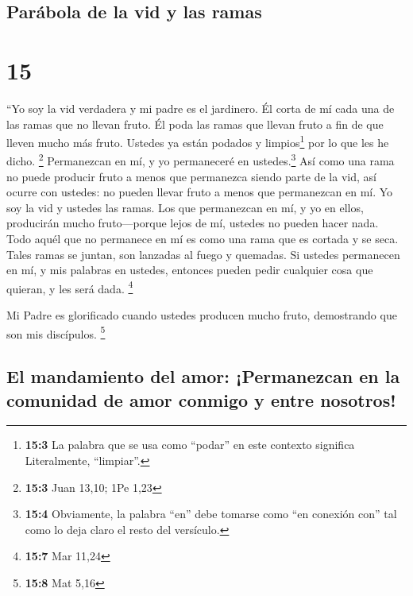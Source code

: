 \hypertarget{paruxe1bola-de-la-vid-y-las-ramas}{%
\subsection{Parábola de la vid y las
ramas}\label{paruxe1bola-de-la-vid-y-las-ramas}}

\hypertarget{section-14}{%
\section{15}\label{section-14}}

 ``Yo soy la vid verdadera y mi padre es el jardinero.
 Él corta de mí cada una de las ramas que no llevan fruto.
Él poda las ramas que llevan fruto a fin de que lleven mucho más fruto.
 Ustedes ya están podados y limpios\footnote{\textbf{15:3}
  La palabra que se usa como ``podar'' en este contexto significa
  Literalmente, ``limpiar''.} por lo que les he dicho. \footnote{\textbf{15:3}
  Juan 13,10; 1Pe 1,23}  Permanezcan en mí, y yo
permaneceré en ustedes.\footnote{\textbf{15:4} Obviamente, la palabra
  ``en'' debe tomarse como ``en conexión con'' tal como lo deja claro el
  resto del versículo.} Así como una rama no puede producir fruto a
menos que permanezca siendo parte de la vid, así ocurre con ustedes: no
pueden llevar fruto a menos que permanezcan en mí.  Yo soy
la vid y ustedes las ramas. Los que permanezcan en mí, y yo en ellos,
producirán mucho fruto---porque lejos de mí, ustedes no pueden hacer
nada.  Todo aquél que no permanece en mí es como una rama
que es cortada y se seca. Tales ramas se juntan, son lanzadas al fuego y
quemadas.  Si ustedes permanecen en mí, y mis palabras en
ustedes, entonces pueden pedir cualquier cosa que quieran, y les será
dada. \footnote{\textbf{15:7} Mar 11,24}

 Mi Padre es glorificado cuando ustedes producen mucho
fruto, demostrando que son mis discípulos. \footnote{\textbf{15:8} Mat
  5,16}

\hypertarget{el-mandamiento-del-amor-permanezcan-en-la-comunidad-de-amor-conmigo-y-entre-nosotros}{%
\subsection{El mandamiento del amor: ¡Permanezcan en la comunidad de
amor conmigo y entre
nosotros!}\label{el-mandamiento-del-amor-permanezcan-en-la-comunidad-de-amor-conmigo-y-entre-nosotros}}

